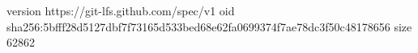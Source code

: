 version https://git-lfs.github.com/spec/v1
oid sha256:5bfff28d5127dbf7f73165d533bed68e62fa0699374f7ae78dc3f50c48178656
size 62862
